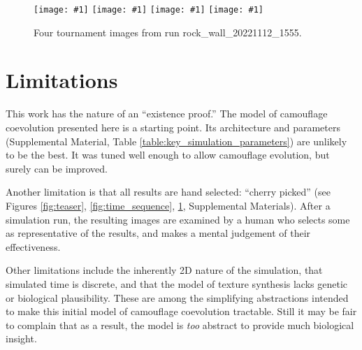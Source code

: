 \documentclass[letterpaper]{article}
\newcommand{\runID}{\footnotesize}
\newcommand{\igfour}[1]{\texttt{[image: \#1]}}
\begin{document}

\begin{figure}
    \igfour{20221112_1555_step_6495.png}
    \hfill
    \igfour{20221112_1555_step_5510.png}
    \hfill
    \igfour{20221112_1555_step_5681.png}
    \hfill
    \igfour{20221112_1555_step_6370.png}
    \caption{Four tournament images from run {\runID rock\_wall\_20221112\_1555}.}
    \label{fig:rock_wall_4x}
\end{figure}


\section{Limitations}
\label{subsec:limitations}
This work has the nature of an “existence proof.” The model of camouflage coevolution presented here is a starting point. Its architecture and parameters (Supplemental Material, Table \ref{table:key_simulation_parameters}) are unlikely to be the best. It was tuned well enough to allow camouflage evolution, but surely can be improved.
\par
Another limitation is that all results are hand selected: “cherry picked” (see Figures \ref{fig:teaser}, \ref{fig:time_sequence}, \ref{fig:rock_wall_4x}, Supplemental Materials). After a simulation run, the resulting images are examined by a human who selects some as representative of the results, and makes a mental judgement of their effectiveness.
\par
Other limitations include the inherently 2D nature of the simulation, that simulated time is discrete, and that the model of texture synthesis lacks genetic or biological plausibility. These are among the simplifying abstractions intended to make this initial model of camouflage coevolution tractable. Still it may be fair to complain that as a result, the model is \textit{too} abstract to provide much biological insight.
\par

\end{document}
